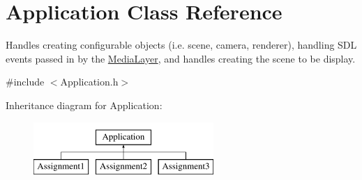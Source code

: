 \hypertarget{class_application}{}\section{Application Class Reference}
\label{class_application}


Handles creating configurable objects (i.\+e. scene, camera, renderer), handling S\+D\+L events passed in by the \hyperlink{class_media_layer}{Media\+Layer}, and handles creating the scene to be display.  




{\ttfamily \#include $<$Application.\+h$>$}

Inheritance diagram for Application\+:\begin{figure}[H]
\begin{center}
\leavevmode
\includegraphics[height=2.000000cm]{class_application}
\end{center}
\end{figure}
